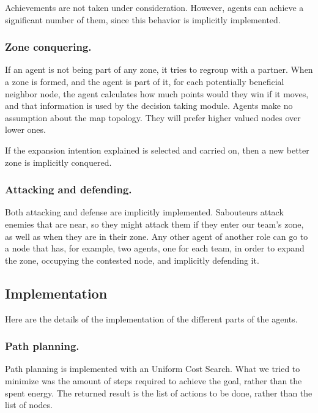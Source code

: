 \documentclass{llncs2e/llncs}
\begin{document}
    Achievements are not taken under consideration. However, agents can
    achieve a significant number of them, since this behavior is implicitly 
    implemented.
    
\subsubsection{Zone conquering.}
    
    If an agent is not being part of any zone, it tries to regroup with a partner. 
    When a zone is formed, and the agent is part of it, for each potentially 
    beneficial neighbor node, the agent calculates how much points would they win 
    if it moves, and that information is used by the decision taking module.
    Agents make no assumption about the map topology. They will prefer higher 
    valued nodes over lower ones.

    If the expansion intention explained is selected and carried on, then a new 
    better zone is implicitly conquered.

\subsubsection{Attacking and defending.}
    
    Both attacking and defense are implicitly implemented. Sabouteurs attack 
    enemies that are near, so they might attack them if they enter our team's 
    zone, as well as when they are in their zone. Any other agent of another role
    can go to a node that has, for example, two agents, one for each team, in order
    to expand the zone, occupying the contested node, and implicitly defending it.
    
\subsection{Implementation}

    Here are the details of the implementation of the different parts of the
    agents.

\subsubsection{Path planning.}

    Path planning is implemented with an Uniform Cost Search. What we tried to 
    minimize was the amount of steps required to achieve the goal, rather than the 
    spent energy. The returned result is the list of actions to be done, rather 
    than the list of nodes.
    
\end{document}
